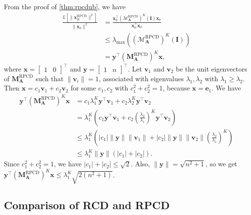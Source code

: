 \documentclass{article}
\theoremstyle{plain}
\theoremstyle{definition}
\theoremstyle{remark}
\def\bigopen#1{\left(#1\right)}
\def\bigclosed#1{\left[#1\right]}
\newcommand{\RPCD}{\text{RPCD}} %
\newcommand{\MARPCD}{\mathcal{M}_{\bm{A}}^{\RPCD}} %
\def\ve{{\bm{e}}}
\def\vv{{\bm{v}}}
\def\vx{{\bm{x}}}
\def\vy{{\bm{y}}}
\def\mA{{\bm{A}}}
\def\mI{{\bm{I}}}
\def\mM{{\bm{M}}}
\newcommand{\E}{\mathbb{E}}
\begin{document}
From the proof of \cref{thm:rpcdub}, we have 
\begin{align*}
    \frac{\E \bigclosed{\|\vx_K^{\RPCD}\|^2}}{\|\vx_0\|^2} &= \frac{\vx_0^{\top} (\MARPCD)^K(\mI) \vx_0}{\vx_0^{\top} \vx_0} \\
    &\le \lambda_{\max} ((\MARPCD)^K(\mI)) \\
    &= \vy^{\top} (\mM_{\mA}^{\RPCD})^K \vx,
\end{align*}
where $\vx = 
\begin{bmatrix}
    1  &  0
\end{bmatrix}^{\top}$ and $\vy = 
\begin{bmatrix}
    1  &  n
\end{bmatrix}^{\top}$. Let $\vv_1$ and $\vv_2$ be the unit eigenvectors of $\mM_{\mA}^{\RPCD}$ such that $\|\vv_i\|=1$, associated with eigenvalues $\lambda_1,\lambda_2$ with $\lambda_1 \ge \lambda_2$. Then $\vx = c_1\vv_1 + c_2\vv_2$ for some $c_1, c_2$ with $c_1^2+c_2^2=1$, because $\vx = \ve_1$.
We have
\begin{align*}
    \vy^{\top} (\mM_{\mA}^{\RPCD})^K \vx &= c_1 \lambda_1^K \vy^{\top} \vv_1 + c_2 \lambda_2^K \vy^{\top} \vv_2 \\
    &= \lambda_1^K \bigopen{c_1 \vy^{\top} \vv_1 + c_2 \bigopen{\frac{\lambda_2}{\lambda_1}}^K \vy^{\top} \vv_2} \\
    &\le \lambda_1^K \bigopen{|c_1|\|\vy\|\|\vv_1\| + |c_2|\|\vy\|\|\vv_2\|\bigopen{\frac{\lambda_2}{\lambda_1}}^K} \\
    &\le \lambda_1^K \|\vy\| (|c_1|+|c_2|).
\end{align*}
Since $c_1^2 + c_2^2 = 1$, we have $|c_1| + |c_2| \le \sqrt{2}$. Also, $\|\vy\| = \sqrt{n^2 + 1}$, so we get $\vy^{\top} (\mM_{\mA}^{\RPCD})^K \vx \le \lambda_1^K \sqrt{2(n^2+1)}$.

\subsection{Comparison of RCD and RPCD}
\end{document}
